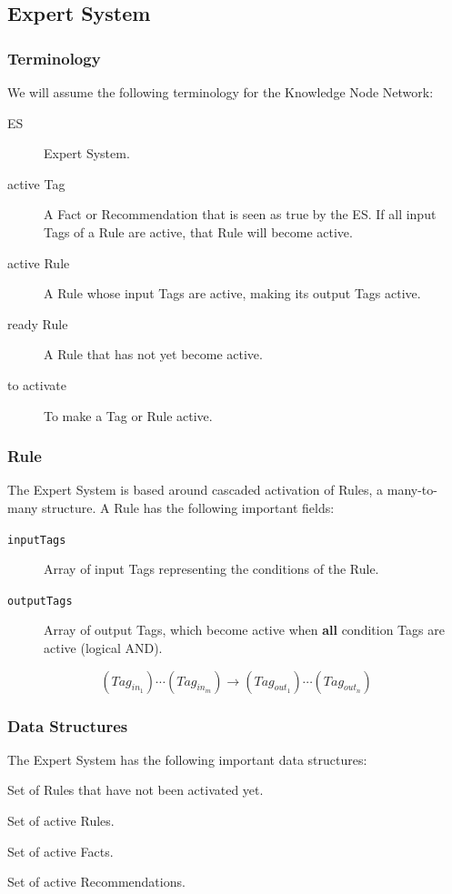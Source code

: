 \documentclass{beamer}
\newcommand{\code}[1]{\texttt{#1}}
\begin{document}
	\subsection{Expert System}
	
	\begin{frame}
		\frametitle{Terminology}
		We will assume the following terminology for the Knowledge Node Network:
		\begin{description}
			\item[ES] Expert System.
			\item[active Tag] A Fact or Recommendation that is seen as true by the ES. If all input Tags of a Rule are active, that Rule will become active.
			\item[active Rule] A Rule whose input Tags are active, making its output Tags active.
			\item[ready Rule] A Rule that has not yet become active.
			\item[to activate] To make a Tag or Rule active.
		\end{description}
	\end{frame}
	
	\begin{frame}
		\frametitle{Rule}
		The Expert System is based around cascaded activation of Rules, a many-to-many structure. A Rule has the following important fields:
		\begin{description}
			\item[\code{inputTags}] Array of input Tags representing the conditions of the Rule.
			\item[\code{outputTags}] Array of output Tags, which become active when \textbf{all} condition Tags are active (logical AND).
		\end{description}
	
		\begin{equation}
			(Tag_{in_1}) \cdots (Tag_{in_m}) \rightarrow (Tag_{out_1}) \cdots (Tag_{out_n})
		\end{equation}
	\end{frame}

	\begin{frame}
		\frametitle{Data Structures}
		The Expert System has the following important data structures:
		\begin{description}[\code{recommendations}]
			\item[\code{readyRules}] Set of Rules that have not been activated yet.
			\item[\code{activeRules}] Set of active Rules.
			\item[\code{facts}] Set of active Facts.
			\item[\code{recommendations}] Set of active Recommendations.
		\end{description}
	\end{frame}
\end{document}

